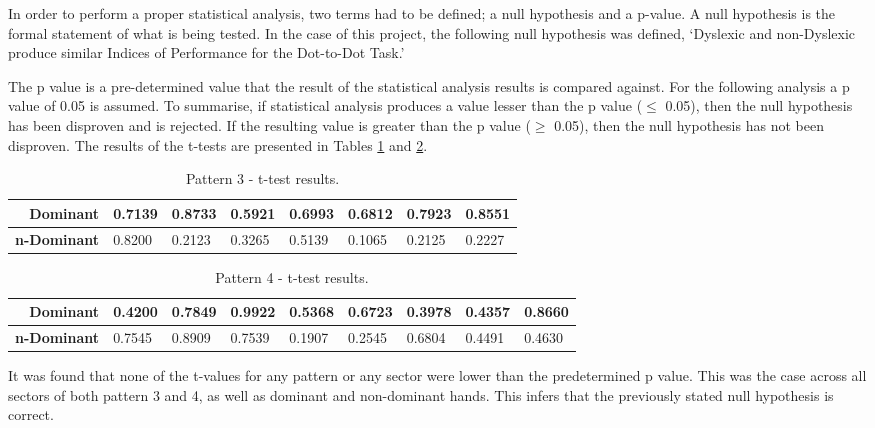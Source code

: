 		In order to perform a proper statistical analysis, two terms had to be defined; a null hypothesis and a p-value. A null hypothesis is the formal statement of what is being tested. In the case of this project, the following null hypothesis was defined,
		‘Dyslexic and non-Dyslexic produce similar Indices of Performance for the Dot-to-Dot Task.’
		
		The p value is a pre-determined value that the result of the statistical analysis results is compared against. For the following analysis a p value of 0.05 is assumed. To summarise, if statistical analysis produces a value lesser than the p value ($\leq$ 0.05), then the null hypothesis has been disproven and is rejected. If the resulting value is greater than the p value ($\geq$ 0.05), then the null hypothesis has not been disproven. The results of the t-tests are presented in Tables \ref{tab_pat_3_t} and \ref{tab_pat_4_t}.

		\begin{table}[h]
			\centering
			\caption{Pattern 3 - t-test results.}
			\label{tab_pat_3_t}
			\begin{tabularx}{\textwidth}{|r|X|X|X|X|X|X|X|}
				\hline
				\textbf{Dominant}   & 0.7139 & 0.8733 & 0.5921 & 0.6993 & 0.6812 & 0.7923 & 0.8551 \\ \hline
				\textbf{n-Dominant} & 0.8200 & 0.2123 & 0.3265 & 0.5139 & 0.1065 & 0.2125 & 0.2227 \\ \hline
			\end{tabularx}
		\end{table}
	
		\begin{table}[h]
			\centering
			\caption{Pattern 4 - t-test results.}
			\label{tab_pat_4_t}
			\begin{tabularx}{\textwidth}{|r|X|X|X|X|X|X|X|X|}
				\hline
				\textbf{Dominant}   & 0.4200 & 0.7849 & 0.9922 & 0.5368 & 0.6723 & 0.3978 & 0.4357 & 0.8660 \\ \hline
				\textbf{n-Dominant} & 0.7545 & 0.8909 & 0.7539 & 0.1907 & 0.2545 & 0.6804 & 0.4491 & 0.4630 \\ \hline
			\end{tabularx}
		\end{table}
		
		It was found that none of the t-values for any pattern or any sector were lower than the predetermined p value. This was the case across all sectors of both pattern 3 and 4, as well as dominant and non-dominant hands. This infers that the previously stated null hypothesis is correct. 


